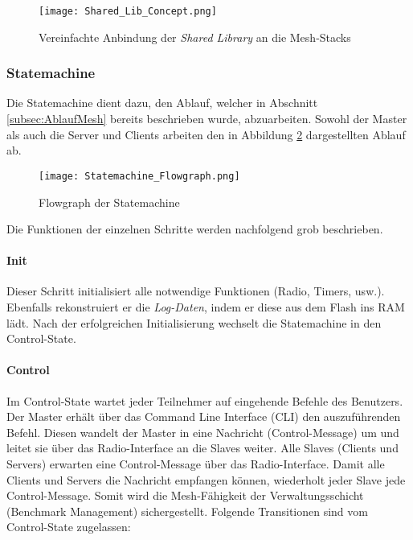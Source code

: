 \begin{figure}[H]
	\centering
	\texttt{[image: Shared\_Lib\_Concept.png]}
	\caption{Vereinfachte Anbindung der \textit{Shared Library} an die Mesh-Stacks}\label{fig:ShardeLibConcept}
\end{figure}


\subsubsection{Statemachine}\label{subsubsec:StatemachineSoftware}

Die Statemachine dient dazu, den Ablauf, welcher in Abschnitt \ref{subsec:AblaufMesh} bereits beschrieben wurde, abzuarbeiten. Sowohl der Master als auch die Server und Clients arbeiten den in Abbildung \ref{fig:StatemachineFLowgraph} dargestellten Ablauf ab. 

\begin{figure}[H]
	\centering
	\texttt{[image: Statemachine\_Flowgraph.png]}
	\caption{Flowgraph der Statemachine}\label{fig:StatemachineFLowgraph}
\end{figure}


Die Funktionen der einzelnen Schritte werden nachfolgend grob beschrieben.

\paragraph{Init}
Dieser Schritt initialisiert alle notwendige Funktionen (Radio, Timers, usw.). Ebenfalls rekonstruiert er die \textit{Log-Daten}, indem er diese aus dem Flash ins RAM lädt. Nach der erfolgreichen Initialisierung wechselt die Statemachine in den Control-State.
	
\paragraph{Control}
Im Control-State wartet jeder Teilnehmer auf eingehende Befehle des Benutzers. Der Master erhält über das Command Line Interface (CLI) den auszuführenden Befehl.
Diesen wandelt der Master in eine Nachricht (Control-Message) um und leitet sie über das Radio-Interface an die Slaves weiter. 
Alle Slaves (Clients und Servers) erwarten eine Control-Message über das Radio-Interface.
Damit alle Clients und Servers die Nachricht empfangen können, wiederholt jeder Slave jede Control-Message.
Somit wird die Mesh-Fähigkeit der Verwaltungsschicht (Benchmark Management) sichergestellt.
Folgende Transitionen sind vom Control-State zugelassen: 

